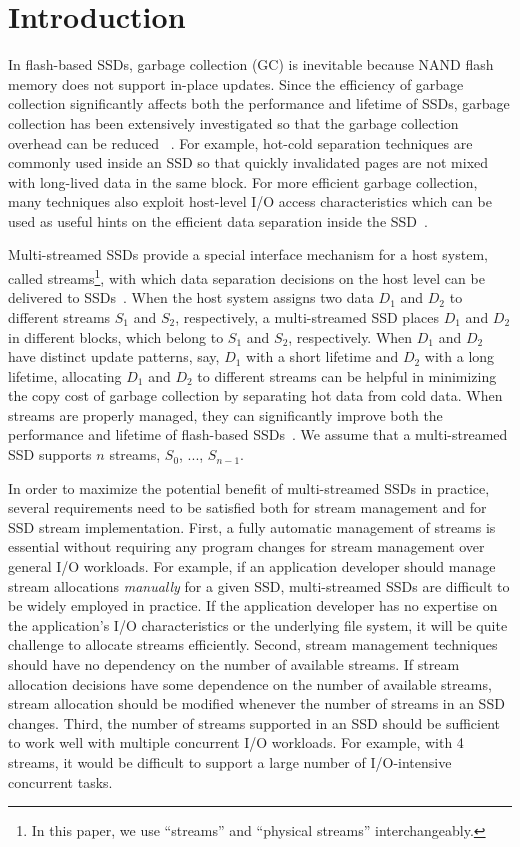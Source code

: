 \section{Introduction}
\label{sec:intro}
In flash-based SSDs, garbage collection (GC) is inevitable because NAND flash 
memory does not support in-place updates.  
Since the efficiency of garbage collection significantly affects  
both the performance and lifetime of SSDs, garbage collection has been extensively 
investigated so that the garbage collection overhead can be reduced
~\cite{GCGreedy, GCVictim, GCTTFlash, HotCold}.  
For example, hot-cold separation techniques are commonly used inside an SSD 
so that quickly invalidated pages are not mixed with long-lived data in the same block.   
For more efficient garbage collection, many techniques also exploit
host-level I/O access characteristics which can be used as useful hints on 
the efficient data separation inside the SSD~\cite{JiTGC, ShadowGC}.

Multi-streamed SSDs provide a special interface mechanism for 
a host system, called streams\footnote{In this paper, we use ``streams''
and ``physical streams'' interchangeably.},
with which data separation decisions 
on the host level can be delivered to SSDs~\cite{T10, MultiStream}.  
When the host system assigns two data $D_1$ and $D_2$ to 
different streams $S_1$ and $S_2$, respectively, a multi-streamed SSD 
places $D_1$ and $D_2$ in different blocks, which belong to $S_1$ and $S_2$, respectively.
When $D_1$ and $D_2$ have distinct update patterns, say, $D_1$ with a short lifetime 
and $D_2$ with a long lifetime, allocating $D_1$ and $D_2$ to different streams 
can be helpful in minimizing the copy cost of
garbage collection by separating hot data from cold data.  
When streams are properly managed, they can significantly
improve both the performance and lifetime of 
flash-based SSDs~\cite{MultiStream, Level, FStream, vStream, AutoStream}.
We assume that a multi-streamed SSD supports $n$ streams, $S_0$, ..., $S_{n-1}$.

In order to maximize the potential benefit of multi-streamed
SSDs in practice, several requirements need to be satisfied both for 
stream management and for SSD stream implementation.
First, a fully automatic management of streams is essential without requiring 
any program changes for stream management over general I/O workloads.
For example, if an
application developer should manage stream allocations {\it manually} for 
a given SSD, multi-streamed SSDs are difficult to be 
widely employed in practice.   If the application
developer has no expertise on the application's I/O characteristics or 
the underlying file system, it will be quite challenge to allocate streams efficiently.   
Second, stream management techniques should have no dependency on 
the number of available streams.  
If stream allocation decisions have some dependence on
the number of available streams,  
stream allocation should be modified
whenever the number of streams in an SSD changes.
Third, the number of streams supported in an SSD should be sufficient 
to work well with multiple concurrent I/O workloads.  
For example, with 4 streams, it would be difficult to support a large
number of I/O-intensive concurrent tasks.  

